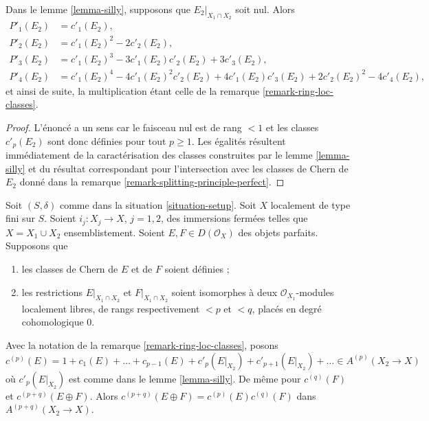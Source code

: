 \begin{lemma}
\label{lemma-silly-compose}
Dans le lemme \ref{lemma-silly}, supposons que $E_2|_{X_1 \cap X_2}$ soit nul. Alors
\begin{align*}
P'_1(E_2) & = c'_1(E_2), \\
P'_2(E_2) & = c'_1(E_2)^2 - 2c'_2(E_2), \\
P'_3(E_2) & = c'_1(E_2)^3 - 3c'_1(E_2)c'_2(E_2) + 3c'_3(E_2), \\
P'_4(E_2) & = c'_1(E_2)^4 - 4c'_1(E_2)^2c'_2(E_2) +
4c'_1(E_2)c'_3(E_2) + 2c'_2(E_2)^2 - 4c'_4(E_2),
\end{align*}
et ainsi de suite, la multiplication étant celle de la remarque \ref{remark-ring-loc-classes}.
\end{lemma}

\begin{proof}
L'énoncé a un sens car le faisceau nul est de rang $< 1$ et
les classes $c'_p(E_2)$ sont donc définies pour tout $p \geq 1$. Les égalités
résultent immédiatement de la caractérisation des classes construites
par le lemme \ref{lemma-silly} et du résultat correspondant pour
l'intersection avec les classes de Chern de $E_2$ donné dans la
remarque \ref{remark-splitting-principle-perfect}.
\end{proof}

\begin{lemma}
\label{lemma-silly-sum-c}
Soit $(S, \delta)$ comme dans la situation \ref{situation-setup}. Soit $X$
localement de type fini sur $S$. Soient $i_j : X_j \to X$, $j = 1, 2$,
des immersions fermées telles que $X = X_1 \cup X_2$ ensemblistement. Soient
$E, F \in D(\mathcal{O}_X)$ des objets parfaits. Supposons que
\begin{enumerate}
\item les classes de Chern de $E$ et de $F$ soient définies ;
\item les restrictions $E|_{X_1 \cap X_2}$ et $F|_{X_1 \cap X_2}$
soient isomorphes à deux $\mathcal{O}_{X_1}$-modules localement libres,
de rangs respectivement $< p$ et $< q$, placés en degré cohomologique $0$.
\end{enumerate}
Avec la notation de la remarque \ref{remark-ring-loc-classes}, posons
$$
c^{(p)}(E) = 1 + c_1(E) + \ldots + c_{p - 1}(E) +
c'_p(E|_{X_2}) + c'_{p + 1}(E|_{X_2}) + \ldots \in A^{(p)}(X_2 \to X)
$$
où $c'_p(E|_{X_2})$ est comme dans le lemme \ref{lemma-silly}. De même
pour $c^{(q)}(F)$ et $c^{(p + q)}(E \oplus F)$.
Alors $c^{(p + q)}(E \oplus F) = c^{(p)}(E)c^{(q)}(F)$
dans $A^{(p + q)}(X_2 \to X)$.
\end{lemma}

